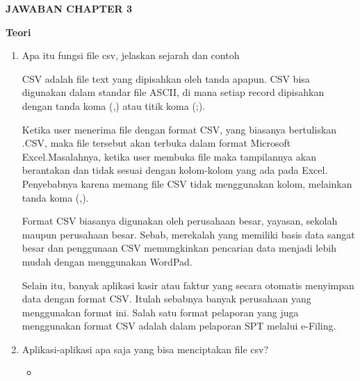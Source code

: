 \item \textbf{JAWABAN CHAPTER 3} 
\par
\textbf{Teori}
\begin{enumerate}
    \item Apa itu fungsi file csv, jelaskan sejarah dan contoh
    \par CSV adalah file text yang dipisahkan oleh tanda apapun.  CSV bisa digunakan dalam standar file ASCII, di mana setiap record dipisahkan dengan tanda koma (,) atau titik koma (;). 

    \par Ketika user menerima file dengan format CSV, yang biasanya bertuliskan .CSV, maka file tersebut akan terbuka dalam format Microsoft Excel.Masalahnya, ketika user membuka file maka tampilannya akan berantakan dan tidak sesuai dengan kolom-kolom yang ada pada Excel. Penyebabnya karena memang file CSV tidak menggunakan kolom, melainkan tanda koma (,).

    \par Format CSV biasanya digunakan oleh perusahaan besar, yayasan, sekolah maupun perusahaan besar. Sebab, merekalah yang memiliki basis data sangat besar dan penggunaan CSV memungkinkan pencarian data menjadi lebih mudah dengan menggunakan WordPad.

    \par Selain itu, banyak aplikasi kasir atau faktur yang secara otomatis menyimpan data dengan format CSV. Itulah sebabnya banyak perusahaan yang menggunakan format ini. Salah satu format pelaporan yang juga menggunakan format CSV adalah dalam pelaporan SPT melalui e-Filing.
    
    \item Aplikasi-aplikasi apa saja yang bisa menciptakan file csv?
    \begin{itemize}
        \item 
    \end{itemize}
\end{enumerate}




